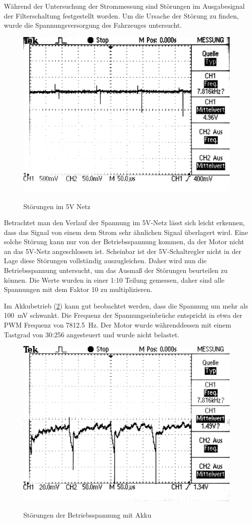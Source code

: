 Während der Untersuchung der Strommessung sind Störungen im Ausgabesignal der Filterschaltung festgestellt worden. Um die Ursache der Störung zu finden, wurde die Spannungsversorgung
des Fahrzeuges untersucht.

\begin{figure}[H]
\centering
\includegraphics[width=.8\textwidth]{5V_supply.png}\\
\caption{Störungen im 5V Netz}%
\label{fig:5V Supply}
\end{figure}

Betrachtet man den Verlauf der Spannung im 5V-Netz lässt sich leicht erkennen, dass das Signal von einem dem Strom sehr ähnlichen Signal überlagert wird.
Eine solche Störung kann nur von der Betriebsspannung kommen, da der Motor nicht an das 5V-Netz angeschlossen ist. Scheinbar ist der 5V-Schaltregler nicht in der Lage diese Störungen vollständig auszugleichen.
Daher wird nun die Betriebsspannung untersucht, um das Ausmaß der Störungen beurteilen zu können.
Die Werte wurden in einer 1:10 Teilung gemessen, daher sind alle Spannungen mit dem Faktor 10 zu multiplizieren.

Im Akkubetrieb (\cref{fig:accu_supply}) kann gut beobachtet werden, dass die Spannung um mehr als \SI{100}{\mV} schwankt. Die Frequenz der Spannungseinbrüche entspricht in etwa
der PWM Frequenz von \SI{7812,5}{\hertz}.  Der Motor wurde währenddessen mit einem Tastgrad von 30:256 angesteuert und wurde nicht belastet.


\begin{figure}[H]
\centering
\includegraphics[width=.8\textwidth]{VCC_AKKU.png}\\
\caption{Störungen der Betriebsspannung mit Akku}%
\label{fig:accu_supply}
\end{figure}


